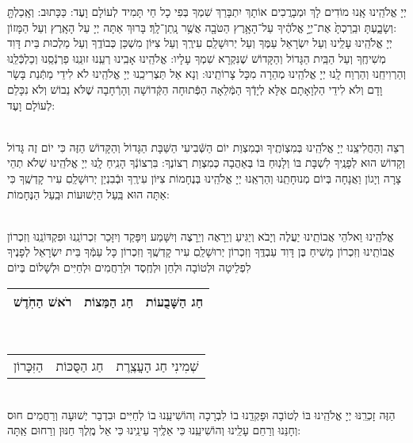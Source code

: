 \documentclass[a4paper, twoside, openany, parskip=half, 10pt]{article}
\begin{document}
\begin{multicols}{2}
 יְיָ אֱלֹהֵֽינוּ אָֽנוּ מוֹדִים לָךְ וּמְבָרֲכִים אוֹתָךְ יִתְבָּרַךְ שִׁמְךָ בְּפִי כָל חַי תָּמִיד לְעוֹלָם וָעֶד: כַּכָּתוּב: וְאָֽכַלְתָּ֖ וְשָׂבָ֑עְתָּ וּבֵֽרַכְתָּ֙ אֶת־יְיָ֣ אֱלֹהֶ֔יךָ עַל־הָאָ֥רֶץ הַטֹּבָ֖ה אֲשֶׁ֥ר נָֽתַן־לָֽךְ׃ בָּרוּךְ אַתָּה יְיָ עַל הָאָֽרֶץ וְעַל הַמָּזוֹן:\\

 יְיָ אֱלֹהֵֽינוּ עָלֵֽינוּ וְעַל יִשְׂרָאֵל עַמֶּךָ וְעַל יְרוּשָׁלַֽםִ עִירֶֽךָ וְעַל צִיּוֹן מִשְׁכַּן כְּבוֹדֶֽךָ וְעַל מַלְכוּת בֵּית דָּוִד מְשִׁיחֶֽךָ וְעַל הַבַּֽיִת הַגָּדוֹל וְהַקָּדוֹשׁ שֶׁנִּקְרָא שִׁמְךָ עָלָיו: אֱלֹהֵֽינוּ אָבִֽינוּ רְעֵֽנוּ זוּנֵֽנוּ פַרְנְֿסֵֽנוּ וְכַלְכְּֿלֵֽנוּ וְהַרְוִיחֵֽנוּ וְהַרְוַח לָֽנוּ יְיָ אֱלֹהֵֽינוּ מְהֵרָה מִכָּל צָרוֹתֵֽינוּ: וְנָא אַל תַּצְרִיכֵֽנוּ יְיָ אֱלֹהֵֽינוּ לֹא לִידֵי מַתְּֿנַת בָּשָׂר וָדָם וְלֹא לִידֵי הַלְוָאָתָם אֶלָּא לְיָדְֿךָ הַמְּֿלֵאָה הַפְּֿתוּחָה הַקְּֿדוֹשָׁה וְהָרְֿחָבָה שֶׁלֹּא נֵבוֹשׁ וְלֹא נִכָּלֵם לְעוֹלָם וָעֶד:\\

\begin{sometimes}

\shabbos\\
רְצֵה וְהַחֲלִיצֵֽנוּ יְיָ אֱלֹהֵֽינוּ בְּמִצְוֹתֶֽיךָ וּבְמִצְוַת יוֹם הַשְּֿׁבִיעִי הַשַּׁבָּת הַגָּדוֹל וְהַקָּדוֹשׁ הַזֶּה כִּי יוֹם זֶה גָּדוֹל וְקָדוֹשׁ הוּא לְפָנֶֽיךָ לִשְׁבָּת בּוֹ וְלָנֽוּחַ בּוֹ בְּאַהֲבָה כְּמִצְוַת רְצוֹנֶךָ: בִּרְצוֹנְֿךָ הָנִֽיחַ לָֽנוּ יְיָ אֱלֹהֵֽינוּ שֶׁלֹא תְהֵי צָרָה וְיָגוֹן וַאֲנָחָה בְּיוֹם מְנוּחָתֵֽנוּ וְהַרְאֵֽנוּ יְיָ אֱלֹהֵֽינוּ בְּנֶחָמוֹת צִיּוֹן עִירֶֽךָ וּבְֿבִנְיַן יְרוּשָׁלַֽםִ עִיר קָדְשֶֽׁךָ כִּי אַתָּה הוּא בַּֽעַל הַיְשׁוּעוֹת וּבַֽעַל הַנֶּחָמוֹת:\\ 

\sepline %

\vspace{-.25\baselineskip}
\\
אֱלֹהֵֽינוּ וֵאלֹהֵי אֲבוֹתֵֽינוּ יַעֲלֶה וְיָבֹא וְיַגִּיעַ וְיֵרָאֶה וְיֵרָצֶה וְיִשָּׁמַע וְיִפָּקֵד וְיִזָּכֵר זִכְרוֹנֵֽנוּ וּפִקְדּוֹנֵֽנוּ וְזִכְרוֹן אֲבוֹתֵֽינוּ וְזִכְרוֹן מָשִׁיחַ בֶּן דָּוִד עַבְדֶּֽךָ וְזִכְרוֹן יְרוּשָׁלַֽםִ עִיר קָדְשֶֽׁךָ וְזִכְרוֹן כָּל עַמְּֿךָ בֵּית יִשְׂרָאֵל לְפָנֶיךָ לִפְלֵיטָה וּלְטוֹבָה וּלְחֵן וּלְחֶֽסֶד וּלְרַחֲמִים וּלְחַיִּים וּלְשָׁלוֹם בְּיוֹם\\ 
\begin{tabular}{c|c|c}
 רֹאשׁ הַחֹֽדֶשׁ & חַג הַמַּצוֹת & חַג הַשָּׁבֻעוֹת\\ \hline
 \end{tabular}\\
\begin{tabular}{c|c|c}
 הַזִּכָּרוֹן & חַג הַסֻּכּוֹת & שְׁמִינִי חַג הָעֲצֶֽרֶת
\end{tabular}\\
הַזֶּה זָכְרֵֽנּוּ יְיָ אֱלֹהֵֽינוּ בּוֹ לְטוֹבָה וּפָקְדֵֽנוּ בוֹ לִבְרָכָה וְהוֹשִׁיעֵֽנוּ בוֹ לְחַיִּים וּבִדְבַר יְשׁוּעָה וְרַחֲמִים חוּס וְחָנֵּנוּ וְרַחֵם עָלֵֽינוּ וְהוֹשִׁיעֵֽנוּ כִּי אֵלֶֽיךָ עֵינֵֽינוּ כִּי אֵל מֶֽלֶךְ חַנּוּן וְרַחוּם אַֽתָּה:


\end{sometimes}
\end{multicols}
\end{document}
